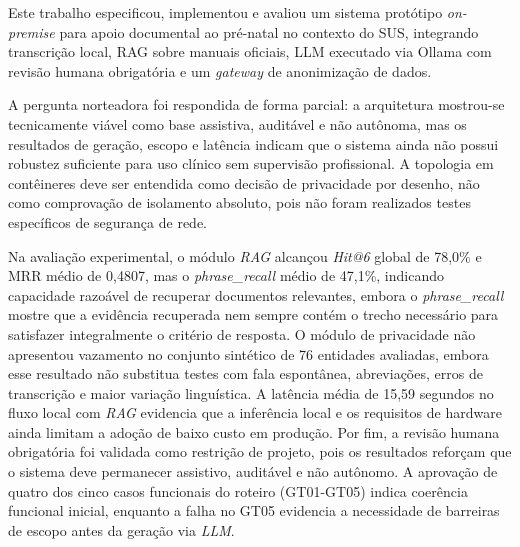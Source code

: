 \documentclass[12pt]{article}
\begin{document}
Este trabalho especificou, implementou e avaliou um sistema protótipo \textit{on-premise} para apoio documental ao pré-natal no contexto do SUS, integrando transcrição local, RAG sobre manuais oficiais, LLM executado via Ollama com revisão humana obrigatória e um \textit{gateway} de anonimização de dados.

A pergunta norteadora foi respondida de forma parcial:
a arquitetura mostrou-se tecnicamente viável como base assistiva, auditável e não autônoma, mas os resultados de geração, escopo e latência indicam que o sistema ainda não possui robustez suficiente para uso clínico sem supervisão profissional.
A topologia em contêineres deve ser entendida como decisão de privacidade por desenho, não como comprovação de isolamento absoluto, pois não foram realizados testes específicos de segurança de rede.

Na avaliação experimental, o módulo \textit{RAG} alcançou \textit{Hit@6} global de 78,0\% e MRR médio de 0,4807, mas o \textit{phrase_recall} médio de 47,1\%, indicando capacidade razoável de recuperar documentos relevantes, embora o \textit{phrase\_recall} mostre que a evidência recuperada nem sempre contém o trecho necessário para satisfazer integralmente o critério de resposta.
O módulo de privacidade não apresentou vazamento no conjunto sintético de 76 entidades avaliadas, embora esse resultado não substitua testes com fala espontânea, abreviações, erros de transcrição e maior variação linguística.
A latência média de 15,59 segundos no fluxo local com \textit{RAG} evidencia que a inferência local e os requisitos de hardware ainda limitam a adoção de baixo custo em produção.
Por fim, a revisão humana obrigatória foi validada como restrição de projeto, pois os resultados reforçam que o sistema deve permanecer assistivo, auditável e não autônomo.
A aprovação de quatro dos cinco casos funcionais do roteiro (GT01-GT05) indica coerência funcional inicial, enquanto a falha no GT05 evidencia a necessidade de barreiras de escopo antes da geração via \textit{LLM}.

\end{document}
